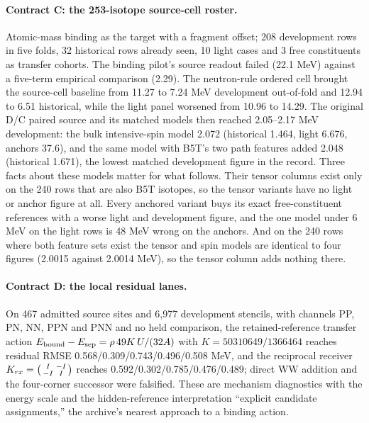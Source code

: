 \paragraph{Contract C: the 253-isotope source-cell roster.} Atomic-mass binding as the target with a fragment offset; 208 development rows in five folds, 32 historical rows already seen, 10 light cases and 3 free constituents as transfer cohorts. The binding pilot's source readout failed (22.1 MeV) against a five-term empirical comparison (2.29).\cite{viipilot} The neutron-rule ordered cell brought the source-cell baseline from 11.27 to 7.24 MeV development out-of-fold and 12.94 to 6.51 historical, while the light panel worsened from 10.96 to 14.29.\cite{viineutroncell} The original D/C paired source and its matched models then reached 2.05--2.17 MeV development: the bulk intensive-spin model 2.072 (historical 1.464, light 6.676, anchors 37.6), and the same model with B5T's two path features added 2.048 (historical 1.671), the lowest matched development figure in the record.\cite{viidcexchange} Three facts about these models matter for what follows. Their tensor columns exist only on the 240 rows that are also B5T isotopes, so the tensor variants have no light or anchor figure at all. Every anchored variant buys its exact free-constituent references with a worse light and development figure, and the one model under 6 MeV on the light rows is 48 MeV wrong on the anchors. And on the 240 rows where both feature sets exist the tensor and spin models are identical to four figures (2.0015 against 2.0014 MeV), so the tensor column adds nothing there.

\paragraph{Contract D: the local residual lanes.} On 467 admitted source sites and 6,977 development stencils, with channels PP, PN, NN, PPN and PNN and no held comparison, the retained-reference transfer action $E_{\rm bound}-E_{\rm sep}=\rho\,49K\,U/(32A)$ with $K=50310649/1366464$ reaches residual RMSE 0.568/0.309/0.743/0.496/0.508 MeV, and the reciprocal receiver $K_{rx}=\begin{psmallmatrix}I&-I\\-I&I\end{psmallmatrix}$ reaches 0.592/0.302/0.785/0.476/0.489; direct WW addition and the four-corner successor were falsified. These are mechanism diagnostics with the energy scale and the hidden-reference interpretation ``explicit candidate assignments,'' the archive's nearest approach to a binding action.\cite{viibindinglive}

